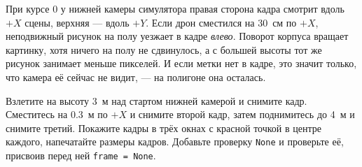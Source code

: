 \begin{infobox}
При курсе 0 у нижней камеры симулятора правая сторона кадра смотрит вдоль $+X$ сцены, верхняя --- вдоль $+Y$. Если дрон сместился на 30~см по $+X$, неподвижный рисунок на полу уезжает в кадре \emph{влево}. Поворот корпуса вращает картинку, хотя ничего на полу не сдвинулось, а с большей высоты тот же рисунок занимает меньше пикселей. И если метки нет в кадре, это значит только, что камера её сейчас не видит, --- на полигоне она осталась.
\end{infobox}

\begin{taskbox}
Взлетите на высоту 3~м над стартом нижней камерой и снимите кадр. Сместитесь на 0.3~м по $+X$ и снимите второй кадр, затем поднимитесь до 4~м и снимите третий. Покажите кадры в трёх окнах с красной точкой в центре каждого, напечатайте размеры кадров. Добавьте проверку \verb|None| и проверьте её, присвоив перед ней \verb|frame = None|.
\end{taskbox}
